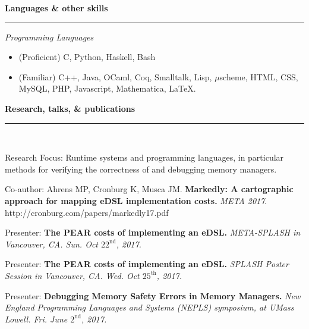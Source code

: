 \documentclass{article}
\begin{document}
{\large\bf Languages \& other skills}\\[-.3cm]
\rule{\linewidth}{.5pt}
\begin{minipage}{\linewidth}

{\it Programming Languages}\\[-.4cm]
\begin{itemize}
\item (Proficient) C, Python, Haskell, Bash
\item (Familiar) C++, Java, OCaml, Coq, Smalltalk, Lisp, $\mu$scheme,
HTML, CSS, MySQL, PHP, Javascript, Mathematica, \LaTeX.
\end{itemize}

\end{minipage}

{\large\bf Research, talks, \& publications}\\[-.3cm]
\rule{\linewidth}{.5pt}\\
\begin{minipage}{\linewidth}
Research Focus: Runtime systems and programming languages, in particular methods
for verifying the correctness of and debugging memory managers.

Co-author: Ahrens MP, Cronburg K, Musca JM. {\bf Markedly: A cartographic
approach for mapping eDSL implementation costs.} {\it META 2017}.
http://cronburg.com/papers/markedly17.pdf

Presenter: {\bf The PEAR costs of implementing an eDSL.} {\it META-SPLASH in
Vancouver, CA. Sun. Oct $22^{\textrm{nd}}$, 2017.}

Presenter: {\bf The PEAR costs of implementing an eDSL.} {\it SPLASH Poster Session in
Vancouver, CA. Wed. Oct $25^{\textrm{th}}$, 2017.}

Presenter: {\bf Debugging Memory Safety Errors in Memory Managers.} {\it New
England Programming Languages and Systems (NEPLS) symposium, at UMass Lowell.
Fri. June $2^{\textrm{nd}}$, 2017.}

\end{minipage}
\end{document}
